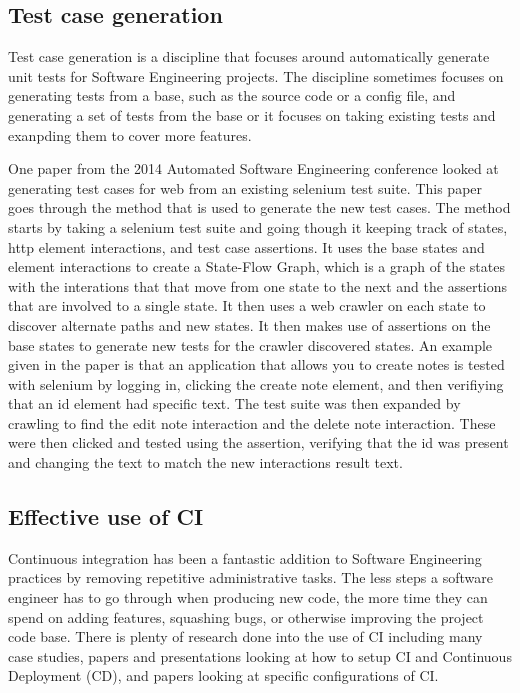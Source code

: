 \subsection{Test case generation}
    Test case generation is a discipline that focuses around automatically generate unit tests for Software Engineering projects. The discipline sometimes focuses on generating tests from a base,
    such as the source code or a config file, and generating a set of tests from the base or it focuses on taking existing tests and exanpding them to cover more features.

    One paper from the 2014 Automated Software Engineering conference looked at generating test cases for web from an existing selenium test suite\cite{WebTestGeneration}. 
    This paper goes through the method that is used to generate the new test cases. The method starts by taking a selenium test suite and going though it keeping track of states, 
    http element interactions, and test case assertions. It uses the base states and element interactions to create a State-Flow Graph, which is a graph of the states with the interations 
    that that move from one state to the next and the assertions that are involved to a single state. It then uses a web crawler on each state to discover alternate paths and new states. 
    It then makes use of assertions on the base states to generate new tests for the crawler discovered states. An example given in the paper is that an application that allows you to 
    create notes is tested with selenium by logging in, clicking the create note element, and then verifiying that an id element had specific text. The test suite was then expanded by crawling
    to find the edit note interaction and the delete note interaction. These were then clicked and tested using the assertion, verifying that the id was present and changing the text to match the
    new interactions result text.

\subsection{Effective use of CI}
	Continuous integration has been a fantastic addition to Software Engineering practices by removing repetitive administrative tasks. The less steps a software engineer has to go through when 
    producing new code, the more time they can spend on adding features, squashing bugs, or otherwise improving the project code base. There is plenty of research done into the use of CI 
    including many case studies, papers and presentations looking at how to setup CI and Continuous Deployment (CD), and papers looking at specific configurations of CI.
	
